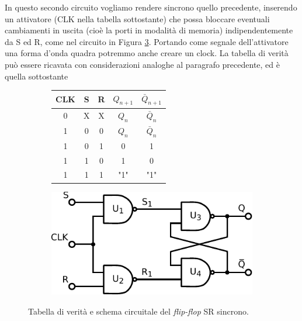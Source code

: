 
In questo secondo circuito vogliamo rendere sincrono quello precedente, inserendo un attivatore (CLK nella tabella sottostante) che possa bloccare eventuali cambiamenti in uscita (cioè la porti in modalità di memoria) indipendentemente da S ed R, come nel circuito in Figura \ref{cir11:FF-SR-s}.
Portando come segnale dell'attivatore una forma d'onda quadra potremmo anche creare un clock.
La tabella di verità può essere ricavata con considerazioni analoghe al paragrafo precedente, ed è quella sottostante

\begin{figure}[htpc]
\centering
	\begin{subfigure}[hc]{.4\textwidth}
		\centering
		{\renewcommand{\arraystretch}{1.2}%
		\begin{tabular}{|c||c|c|c|c|}
		\hline
		CLK & S & R & $Q_{n+1}$ & $\bar Q_{n+1}$  \\
		\hline \hline
		0 & X & X & $Q_n$ & $\bar Q_n$\\
		\hline \hline
		 1&0 & 0 & $Q_n$ & $\bar Q_n$\\
		\hline
		1&0 & 1 & 0 &1\\
		\hline
		1&1 & 0 & 1 & 0\\
		\hline
		1&1 & 1 & "1" & "1"\\
		\hline
		\end{tabular}}
		\caption{}
		\label{tab11:FFSR2}
        \end{subfigure}
        \begin{subfigure}[hc]{.4\textwidth}
		\centering
		\includegraphics[width=.7\textwidth]{../E11/latex/FF-SR-sync.pdf}
		\caption{}
		\label{cir11:FF-SR-s}
        \end{subfigure}
\caption{Tabella di verità e schema circuitale del \textit{flip-flop} SR sincrono.}
\end{figure}

